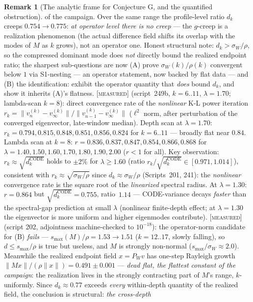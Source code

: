\documentclass[11pt]{article}
\theoremstyle{definition}
\newtheorem{remark}[theorem]{Remark}
\newcommand{\MEASURED}{\textup{[\textsc{measured}]}}
\newcommand{\lam}{\lambda}
\begin{document}
\begin{remark}[The analytic frame for Conjecture G, and the quantified
obstruction]
{of the campaign.} Over the same range the profile-level ratio $d_k$
creeps $0.754 \to 0.775$: \emph{at operator level there is no creep} ---
the $g$-creep is a realization phenomenon (the actual difference field
shifts its overlap with the modes of $M$ as $k$ grows), not an operator
one. Honest structural note: $d_k > \sigma_W/\rho$, so the compressed
dominant mode does \emph{not} directly bound the realized endpoint
ratio; the sharpest sub-questions are now (A) prove
$\sigma_W(k)/\rho(k)$ convergent below $1$ via S1-nesting --- an
operator statement, now backed by flat data --- and (B) the
identification: exhibit the operator quantity that \emph{does} bound
$d_k$, and show it inherits (A)'s flatness.
\MEASURED{} (script~249b, $k{=}6..11$, $\lam{=}1.70$; lambda-scan $k{=}8$):
direct convergence rate of the \emph{nonlinear} K-L power iteration
$r_k = \|v^{(k)}_n - v^{(k)}_\infty\|/\|v^{(k)}_{n-1} - v^{(k)}_\infty\|$
($\ell^2$ norm, after perturbation of the converged eigenvector,
late-window median).
Depth scan at $\lam=1.70$: $r_k = 0.794, 0.815, 0.848, 0.851, 0.856, 0.824$
for $k=6..11$ --- broadly flat near $0.84$.
Lambda scan at $k=8$: $r = 0.836, 0.837, 0.847, 0.854, 0.866, 0.868$
for $\lam = 1.40, 1.50, 1.60, 1.70, 1.80, 1.90, 2.00$ ($r < 1$ for all).
Key observation: $r_k \approx \sqrt{d_k^{\mathrm{CODE}}}$ holds to $\pm 2\%$
for $\lam \ge 1.60$ (ratio $r_k/\sqrt{d_k^{\mathrm{CODE}}} \in [0.971, 1.014]$),
consistent with $r_k \approx \sqrt{\sigma_W/\rho}$ since
$d_k \approx \sigma_W/\rho$ (Scripts~201, 241):
the \emph{nonlinear} convergence rate is the square root of the
\emph{linearized} spectral radius.
At $\lam=1.30$: $r = 0.864$ but $\sqrt{d_k^{\mathrm{CODE}}} = 0.755$,
ratio~$1.14$ --- CODE-variance decays \emph{faster} than the spectral-gap
prediction at small $\lam$ (nonlinear finite-depth effect; at $\lam{=}1.30$
the eigenvector is more uniform and higher eigenmodes contribute).
\MEASURED{} (script 202, adjointness machine-checked to $10^{-18}$):
the operator-norm candidate for (B) \emph{fails} ---
$s_{\max}(M)/\rho = 1.53 \to 1.51$ ($k = 12..17$, slowly falling), so
$d \le s_{\max}/\rho$ is true but useless, and $M$ is strongly
non-normal ($s_{\max}/\sigma_W \approx 2.0$). Meanwhile the realized
endpoint field $x = P_W v$ has one-step Rayleigh growth
$\|Mx\|/(\rho\|x\|) = 0.491 \pm 0.001$ --- \emph{dead flat, the
flattest constant of the campaign}: the realization lives in the
strongly contracting part of $M$'s range, $k$-uniformly. Since
$d_k \approx 0.77$ exceeds \emph{every} within-depth quantity of the
realized field, the conclusion is structural: \emph{the cross-depth
}
\end{remark}
\end{document}
